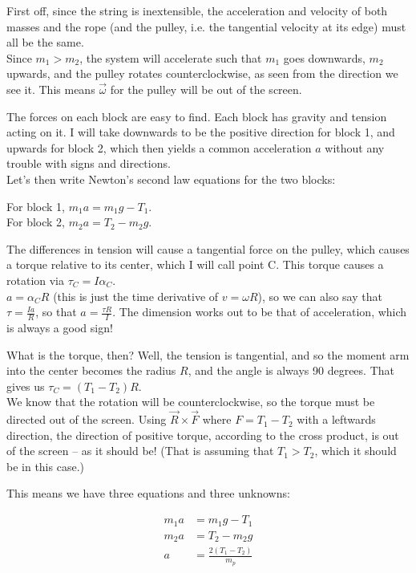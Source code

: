 \documentclass[8.01x]{subfiles}
\begin{document}
First off, since the string is inextensible, the acceleration and velocity of both masses and the rope (and the pulley, i.e. the tangential velocity at its edge) must all be the same.\\
Since $m_1 > m_2$, the system will accelerate such that $m_1$ goes downwards, $m_2$ upwards, and the pulley rotates counterclockwise, as seen from the direction we see it. This means $\vec{\omega}$ for the pulley will be out of the screen.

The forces on each block are easy to find. Each block has gravity and tension acting on it. I will take downwards to be the positive direction for block 1, and upwards for block 2, which then yields a common acceleration $a$ without any trouble with signs and directions.\\
Let's then write Newton's second law equations for the two blocks:

For block 1, $m_1 a = m_1 g - T_1$.\\
For block 2, $m_2 a = T_2 - m_2 g$.

The differences in tension will cause a tangential force on the pulley, which causes a torque relative to its center, which I will call point C. This torque causes a rotation via $\tau_C = I \alpha_C$.\\
$a = \alpha_C R$ (this is just the time derivative of $v = \omega R$), so we can also say that $\displaystyle \tau = \frac{I a}{R}$, so that $\displaystyle a = \frac{\tau R}{I}$. The dimension works out to be that of acceleration, which is always a good sign!

What is the torque, then? Well, the tension is tangential, and so the moment arm into the center becomes the radius $R$, and the angle is always 90 degrees. That gives us $\tau_C = (T_1 - T_2) R$.\\
We know that the rotation will be counterclockwise, so the torque must be directed out of the screen. Using $\vec{R} \times \vec{F}$ where $F = T_1 - T_2$ with a leftwards direction, the direction of positive torque, according to the cross product, is out of the screen -- as it should be! (That is assuming that $T_1 > T_2$, which it should be in this case.)

This means we have three equations and three unknowns:

\begin{align}
m_1 a &= m_1 g - T_1\\
m_2 a &= T_2 - m_2 g\\
a &= \frac{2(T_1 - T_2)}{m_p}
\end{align}
\end{document}
